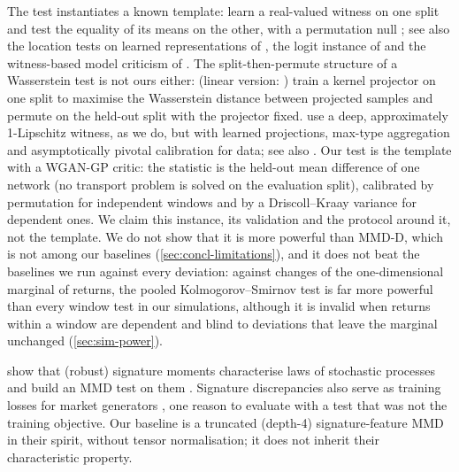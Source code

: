 The \WC{} test instantiates a known template: learn a real-valued witness on one split and test the
equality of its means on the other, with a permutation null \citep{kubler2022witness}; see also
the location tests on learned representations of \citet{kirchler2020two}, the logit instance of
\citet{cheng2022classification} and the witness-based model criticism of
\citet{lloyd2015statistical}. The split-then-permute structure of a Wasserstein test is not ours
either: \citet{wang2022two} (linear version: \citealp{wang2021two}) train a kernel projector on one
split to maximise the Wasserstein distance between projected samples and permute on the held-out
split with the projector fixed.  use a deep, approximately 1-Lipschitz
witness, as we do, but with learned projections, max-type aggregation and asymptotically pivotal
calibration for \iid{} data; see also \citet{ramdas2017wasserstein}. Our test is the template
with a WGAN-GP critic: the statistic is the held-out mean difference of one network (no transport
problem is solved on the evaluation split), calibrated by permutation for independent windows and
by a Driscoll--Kraay variance for dependent ones. We claim this instance, its validation and the
protocol around it, not the template. We do not show that it is more powerful than MMD-D, which is
not among our baselines (\cref{sec:concl-limitations}), and it does not beat the baselines we run
against every deviation: against changes of the one-dimensional marginal of returns, the pooled
Kolmogorov--Smirnov test is far more powerful than every window test in our simulations, although
it is invalid when returns within a window are dependent and blind to deviations that leave the
marginal unchanged (\cref{sec:sim-power}).

 show that (robust) signature moments characterise laws of
stochastic processes and build an MMD test on them
\citep[see also][]{lyons1998differential,kiraly2019kernels}. Signature discrepancies also serve as
training losses for market generators \citep{ni2021sig,liao2024sig,issa2023nonadversarial}, one
reason to evaluate with a test that was not the training objective. Our \SigMMD{} baseline is a
truncated (depth-4) signature-feature MMD in their spirit, without tensor normalisation; it does
not inherit their characteristic property.

